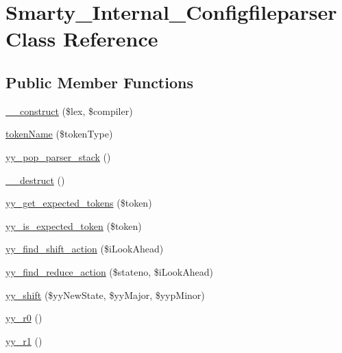 \hypertarget{class_smarty___internal___configfileparser}{}\section{Smarty\+\_\+\+Internal\+\_\+\+Configfileparser Class Reference}
\label{class_smarty___internal___configfileparser}
\subsection*{Public Member Functions}
\begin{DoxyCompactItemize}
\item 
\hyperlink{class_smarty___internal___configfileparser_a88f21d9c2bfefae24140906c124699cd}{\+\_\+\+\_\+construct} (\$lex, \$compiler)
\item 
\hyperlink{class_smarty___internal___configfileparser_a352279cd57963ae851bc753d0a594f20}{token\+Name} (\$token\+Type)
\item 
\hyperlink{class_smarty___internal___configfileparser_a77f6b72a07ed6c56a12e2411223d1862}{yy\+\_\+pop\+\_\+parser\+\_\+stack} ()
\item 
\hyperlink{class_smarty___internal___configfileparser_a421831a265621325e1fdd19aace0c758}{\+\_\+\+\_\+destruct} ()
\item 
\hyperlink{class_smarty___internal___configfileparser_a6c0edb6b86d23ca54f81ccfd4c1831b2}{yy\+\_\+get\+\_\+expected\+\_\+tokens} (\$token)
\item 
\hyperlink{class_smarty___internal___configfileparser_addf1cba9aaadf9ca1e265cdd8e19b07c}{yy\+\_\+is\+\_\+expected\+\_\+token} (\$token)
\item 
\hyperlink{class_smarty___internal___configfileparser_a05ab831440011fdfe6a6505c0dc34b66}{yy\+\_\+find\+\_\+shift\+\_\+action} (\$i\+Look\+Ahead)
\item 
\hyperlink{class_smarty___internal___configfileparser_a3eaa296803983069c6c2c02dca2163b4}{yy\+\_\+find\+\_\+reduce\+\_\+action} (\$stateno, \$i\+Look\+Ahead)
\item 
\hyperlink{class_smarty___internal___configfileparser_ab7616daa9339158155f953ed7ea51e17}{yy\+\_\+shift} (\$yy\+New\+State, \$yy\+Major, \$yyp\+Minor)
\item 
\hyperlink{class_smarty___internal___configfileparser_a54c88e2da90a6e41f0115dd8d6809bf2}{yy\+\_\+r0} ()
\item 
\hyperlink{class_smarty___internal___configfileparser_a833626b9720d08c05da8bfa44487b29d}{yy\+\_\+r1} ()

\end{DoxyCompactItemize}
